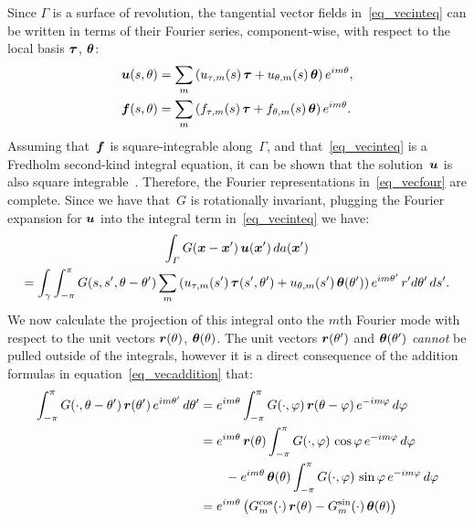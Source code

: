 \documentclass[11pt]{article}
\renewcommand{\phi}{\varphi}
\newcommand{\vct}{\vectorsym}
\newcommand{\bx}{\vct{ x}}
\newcommand{\bff}{\vct{ f}}
\newcommand\bsf{\vct{ f}}
\newcommand\rhat{\vct{{r}}}
\newcommand\tauhat{\vct{{ \tau}}}
\newcommand\thetahat{{\vct{{\theta}}}}
\newcommand\bu{\vct{ u}}
\numberwithin{equation}{section}
\begin{document}
Since $\Gamma$ is a surface of
revolution, the tangential vector fields in~\eqref{eq_vecinteq}
can be written in terms of
their Fourier series, component-wise, with respect to the local basis
$\tauhat$, $\thetahat$:
\begin{equation}\label{eq_vecfour}
  \begin{aligned}
    \bu(s,\theta) &= \sum_m \left( u_{\tau,m}(s) \, \tauhat
    + u_{\theta,m}(s) \, \thetahat \right) e^{im\theta} ,\\
    \bsf(s,\theta) &= \sum_m \left( f_{\tau,m}(s) \, \tauhat
    + f_{\theta,m}(s) \, \thetahat \right) e^{im\theta}.
  \end{aligned}
\end{equation}
Assuming that~$\bff$ is square-integrable along~$\Gamma$, and
that~\eqref{eq_vecinteq} is a Fredholm second-kind integral equation,
it can be shown that the solution~$\bu$ is also square
integrable~\cite{atkinson_1997}.  Therefore, the Fourier
representations in~\eqref{eq_vecfour} are complete. Since we have
that~$G$ is rotationally invariant, plugging the Fourier
expansion for $\bu$ into the integral term in~\eqref{eq_vecinteq} we
have:
\begin{multline}
 \int_\Gamma G(\bx-\bx') \, \bu(\bx') \, da(\bx')\\ = \int_\gamma
 \int_{-\pi}^\pi G(s,s',\theta-\theta') \sum_m \left( u_{\tau,m}(s') \,
 \tauhat(s',\theta') + u_{\theta,m}(s') \, \thetahat(\theta') \right)
 e^{im\theta'} \, r' d\theta' \, ds'.
\end{multline}
We now calculate the projection of this integral onto the
$m$th Fourier mode with respect to the unit vectors
$\rhat(\theta)$, $\thetahat(\theta)$.  The unit vectors
$\rhat(\theta')$ and $\thetahat(\theta')$ {\em cannot} be pulled
outside of the integrals, however it is a direct consequence of the
addition formulas in equation~\eqref{eq_vecaddition} that:
\begin{equation}
  \begin{aligned}
    \int_{-\pi}^\pi G(\cdot,\theta-\theta') \, \rhat(\theta') \,
    e^{im\theta'} \, d\theta' &= e^{im\theta}
    \int_{-\pi}^\pi G(\cdot,\phi) \, \rhat(\theta-\phi) \,
    e^{-im\phi} \, d\phi \\
    &= e^{im\theta} \, \rhat(\theta) \int_{-\pi}^\pi G(\cdot,\phi) \,
    \cos\phi \,  
    e^{-im\phi} \, d\phi  \\
    &\qquad -
    e^{im\theta} \, \thetahat(\theta) \int_{-\pi}^\pi G(\cdot,\phi) \,
    \sin\phi  \, 
    e^{-im\phi} \, d\phi  \\
    &= e^{im\theta} \left(  G_m^{\cos}(\cdot) \, \rhat(\theta) -
        G_m^{\sin}(\cdot) \, \thetahat(\theta) \right) 
  \end{aligned}
\end{equation}
\end{document}
